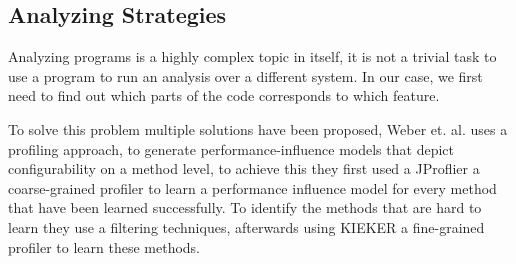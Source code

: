 

\subsection{Analyzing Strategies}\label{analyzing-strats}
Analyzing programs is a highly complex topic in itself, it is not a trivial task to use a program to run an analysis over a different system.
In our case, we first need to find out which parts of the code corresponds to which feature.

To solve this problem multiple solutions have been proposed, Weber et. al. \cite{White-box-Profiling} uses a profiling approach, to generate 
performance-influence models that depict configurability on a method level, to achieve this they first used a JProflier a coarse-grained profiler
to learn a performance influence model for every method that have been learned successfully. 
To identify the methods that are hard to learn they use a filtering techniques, afterwards using KIEKER a fine-grained profiler to learn these methods.

